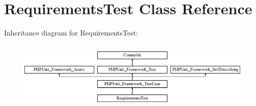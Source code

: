 \hypertarget{class_requirements_test}{}\section{Requirements\+Test Class Reference}
\label{class_requirements_test}
Inheritance diagram for Requirements\+Test\+:\begin{figure}[H]
\begin{center}
\leavevmode
\includegraphics[height=3.303835cm]{class_requirements_test}
\end{center}
\end{figure}
